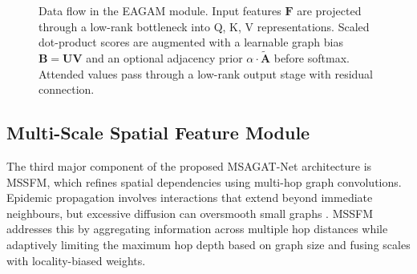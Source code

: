 \documentclass[final,1p,times]{elsarticle}
\begin{document}
\begin{figure}[!ht]
{}%
\caption{Data flow in the EAGAM module. Input features $\mathbf{F}$ are projected through a low-rank bottleneck into Q, K, V representations. Scaled dot-product scores are augmented with a learnable graph bias $\mathbf{B}=\mathbf{UV}$ and an optional adjacency prior $\alpha\cdot\tilde{\mathbf{A}}$ before softmax. Attended values pass through a low-rank output stage with residual connection.}
\label{fig:eagam_module}
\end{figure}

\subsection{Multi-Scale Spatial Feature Module}
\label{sec:mssfm}

The third major component of the proposed MSAGAT-Net architecture is MSSFM, which refines spatial dependencies using multi-hop graph convolutions. Epidemic propagation involves interactions that extend beyond immediate neighbours, but excessive diffusion can oversmooth small graphs \cite{li2018deeper}. MSSFM addresses this by aggregating information across multiple hop distances while adaptively limiting the maximum hop depth based on graph size and fusing scales with locality-biased weights.
\end{document}
